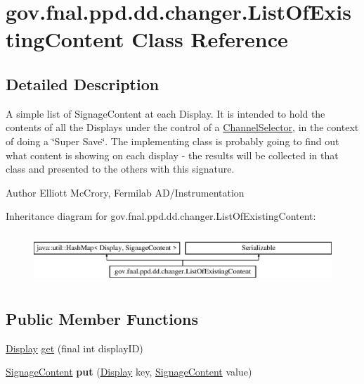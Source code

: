 \hypertarget{classgov_1_1fnal_1_1ppd_1_1dd_1_1changer_1_1ListOfExistingContent}{\section{gov.\-fnal.\-ppd.\-dd.\-changer.\-List\-Of\-Existing\-Content Class Reference}
\label{classgov_1_1fnal_1_1ppd_1_1dd_1_1changer_1_1ListOfExistingContent}
}


\subsection{Detailed Description}
A simple list of Signage\-Content at each Display. It is intended to hold the contents of all the Displays under the control of a \hyperlink{classgov_1_1fnal_1_1ppd_1_1dd_1_1ChannelSelector}{Channel\-Selector}, in the context of doing a \char`\"{}\-Super Save\char`\"{}. The implementing class is probably going to find out what content is showing on each display -\/ the results will be collected in that class and presented to the others with this signature.

\begin{DoxyAuthor}{Author}
Elliott Mc\-Crory, Fermilab A\-D/\-Instrumentation 
\end{DoxyAuthor}
Inheritance diagram for gov.\-fnal.\-ppd.\-dd.\-changer.\-List\-Of\-Existing\-Content\-:\begin{figure}[H]
\begin{center}
\leavevmode
\includegraphics[height=1.931034cm]{classgov_1_1fnal_1_1ppd_1_1dd_1_1changer_1_1ListOfExistingContent}
\end{center}
\end{figure}
\subsection*{Public Member Functions}
\begin{DoxyCompactItemize}
\item 
\hyperlink{interfacegov_1_1fnal_1_1ppd_1_1dd_1_1signage_1_1Display}{Display} \hyperlink{classgov_1_1fnal_1_1ppd_1_1dd_1_1changer_1_1ListOfExistingContent_ac46b8d64363de8a10423c7d620d98593}{get} (final int display\-I\-D)
\item 
\hypertarget{classgov_1_1fnal_1_1ppd_1_1dd_1_1changer_1_1ListOfExistingContent_a946a8fbe31fde4f9a1ead3a68e0912ae}{\hyperlink{interfacegov_1_1fnal_1_1ppd_1_1dd_1_1signage_1_1SignageContent}{Signage\-Content} {\bfseries put} (\hyperlink{interfacegov_1_1fnal_1_1ppd_1_1dd_1_1signage_1_1Display}{Display} key, \hyperlink{interfacegov_1_1fnal_1_1ppd_1_1dd_1_1signage_1_1SignageContent}{Signage\-Content} value)}\label{classgov_1_1fnal_1_1ppd_1_1dd_1_1changer_1_1ListOfExistingContent_a946a8fbe31fde4f9a1ead3a68e0912ae}

\end{DoxyCompactItemize}


